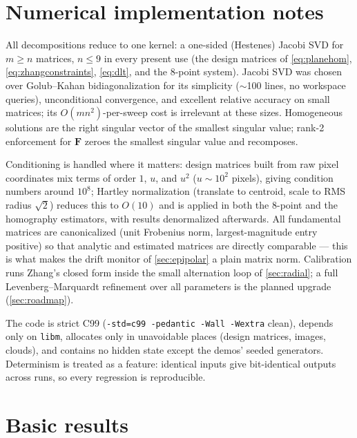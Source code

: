 \documentclass[11pt]{article}
\theoremstyle{definition}
\newcommand{\mat}[1]{\mathbf{#1}}
\newcommand{\F}{\mat{F}}
\newcommand{\code}[1]{\texttt{#1}}
\begin{document}
\section{Numerical implementation notes}
\label{sec:numerics}

All decompositions reduce to one kernel: a one-sided (Hestenes) Jacobi SVD
\cite{GolubVanLoan2013} for $m\ge n$ matrices, $n\le9$ in every present use
(the design matrices of \eqref{eq:planehom}, \eqref{eq:zhangconstraints},
\eqref{eq:dlt}, and the 8-point system). Jacobi SVD was chosen over
Golub--Kahan bidiagonalization for its simplicity ($\sim$100 lines, no
workspace queries), unconditional convergence, and excellent relative
accuracy on small matrices; its $O(mn^2)$-per-sweep cost is irrelevant at
these sizes. Homogeneous solutions are the right singular vector of the
smallest singular value; rank-2 enforcement for $\F$ zeroes the smallest
singular value and recomposes.

Conditioning is handled where it matters: design matrices built from raw
pixel coordinates mix terms of order $1$, $u$, and $u^2$
($u\sim10^2$ pixels), giving condition numbers around $10^8$; Hartley
normalization \cite{Hartley1997} (translate to centroid, scale to RMS
radius $\sqrt2$) reduces this to $O(10)$ and is applied in both the 8-point
and the homography estimators, with results denormalized afterwards. All
fundamental matrices are canonicalized (unit Frobenius norm,
largest-magnitude entry positive) so that analytic and estimated matrices
are directly comparable --- this is what makes the drift monitor of
\autoref{sec:epipolar} a plain matrix norm. Calibration runs Zhang's
closed form inside the small alternation loop of \autoref{sec:radial};
a full Levenberg--Marquardt refinement over all parameters is the planned
upgrade (\autoref{sec:roadmap}).

The code is strict C99 (\code{-std=c99 -pedantic -Wall -Wextra} clean),
depends only on \code{libm}, allocates only in unavoidable places (design
matrices, images, clouds), and contains no hidden state except the demos'
seeded generators. Determinism is treated as a feature: identical inputs
give bit-identical outputs across runs, so every regression is reproducible.

\section{Basic results}
\label{sec:results}
\end{document}
